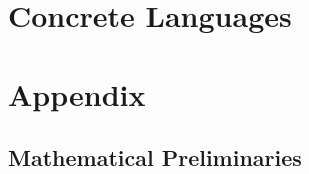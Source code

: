 \documentclass{book}
\begin{document}
\part{Concrete Languages}

% 
%
% 
%
 

%
%  

\part{Appendix}

\appendix

\chapter{Mathematical Preliminaries}\label{sec:math}



\tocentryBib


%
%
%
\end{document}
